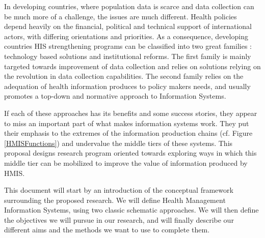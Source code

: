 In developing countries, where population data is scarce and data collection can be much more of a challenge, the issues are much different. Health policies depend heavily on the financial, political and technical support of international actors, with differing orientations and priorities. As a consequence, developing countries HIS strengthening programs can be classified into two great families : technology based solutions and institutional reforms. The first family is mainly targeted towards improvement of data collection and relies on solutions relying on the revolution in  data collection capabilities. The second family relies on the adequation of health information produces to policy makers needs, and usually promotes a top-down and normative approach to Information Systems.

If each of these approaches has its benefits and some success stories,  they appear to miss an important part of what makes information systems work. They put their emphasis to the extremes of the information production chains (cf. Figure \ref{HMISFunctions}) and undervalue the middle tiers of these systems. This proposal designs research program oriented towards exploring ways in which this middle tier can be mobilized to improve the value of information produced by HMIS.

This document will start by an introduction of the conceptual framework surrounding the proposed research. We will define Health Management Information Systems, using two classic schematic approaches. We will then define the objectives we will pursue in our research, and will finally describe our different aims and the methods we want to use to complete them.
